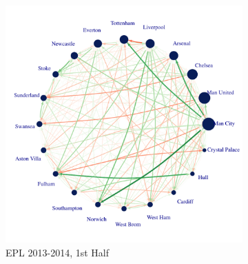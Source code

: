 \documentclass[12pt,a4paper,twoside,openany]{book}\usepackage[]{graphicx}\usepackage[]{color}
\makeatletter
\def\maxwidth{ %
  \ifdim\Gin@nat@width>\linewidth
    \linewidth
  \else
    \Gin@nat@width
  \fi
}
\newenvironment{knitrout}{}{} %
\makeatother
\begin{document}
\begin{figure}[H] %

\hspace*{\fill}
\begin{subfigure}{0.40\textwidth}
\begin{knitrout}
\color{fgcolor}

{\centering \includegraphics[width=\maxwidth]{figure/unnamed-chunk-7-1} 

}



\end{knitrout}
\caption{EPL 2013-2014, 1st Half}
\end{subfigure}\hspace*{\fill}
\begin{subfigure}{0.40\textwidth}
\begin{knitrout}
\color{fgcolor}


\end{knitrout}
\end{subfigure}
\end{figure}
\end{document}
